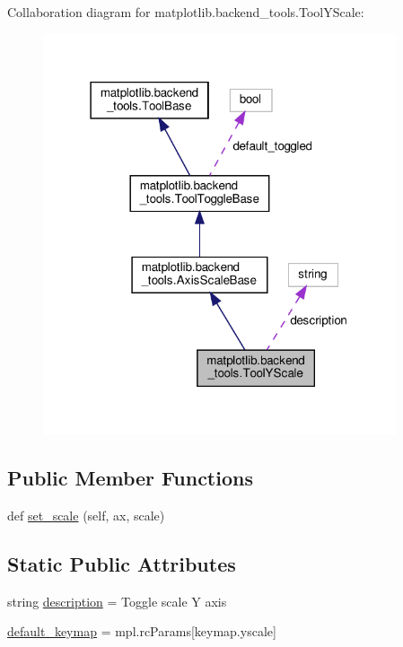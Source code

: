 Collaboration diagram for matplotlib.\+backend\+\_\+tools.\+Tool\+Y\+Scale\+:
\nopagebreak
\begin{figure}[H]
\begin{center}
\leavevmode
\includegraphics[width=295pt]{classmatplotlib_1_1backend__tools_1_1ToolYScale__coll__graph}
\end{center}
\end{figure}
\subsection*{Public Member Functions}
\begin{DoxyCompactItemize}
\item 
def \hyperlink{classmatplotlib_1_1backend__tools_1_1ToolYScale_ac1702ef9d15b264c9e3637f880ef39cf}{set\+\_\+scale} (self, ax, scale)
\end{DoxyCompactItemize}
\subsection*{Static Public Attributes}
\begin{DoxyCompactItemize}
\item 
string \hyperlink{classmatplotlib_1_1backend__tools_1_1ToolYScale_abcd30027d63fb58782283800246f2b67}{description} = \textquotesingle{}Toggle scale Y axis\textquotesingle{}
\item 
\hyperlink{classmatplotlib_1_1backend__tools_1_1ToolYScale_a9c20c7862b8b875dd492c5fa44347d4a}{default\+\_\+keymap} = mpl.\+rc\+Params\mbox{[}\textquotesingle{}keymap.\+yscale\textquotesingle{}\mbox{]}
\end{DoxyCompactItemize}



